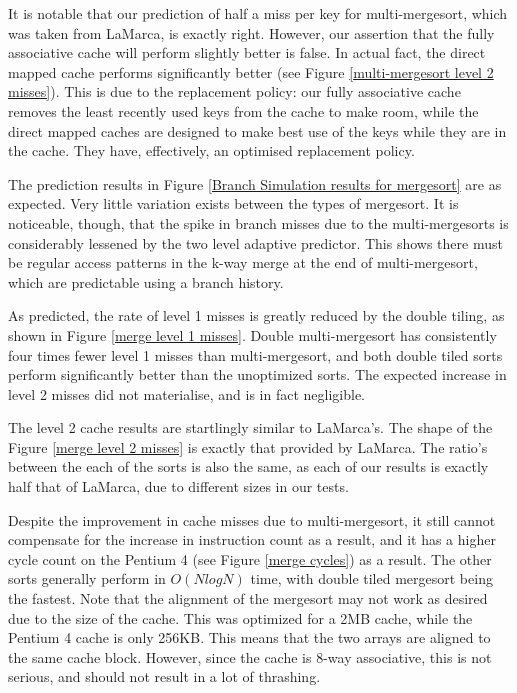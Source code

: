 It is notable that our prediction of half a miss per key for multi-mergesort,
which was taken from LaMarca, is exactly right. However, our assertion that the
fully associative cache will perform slightly better is false. In actual fact,
the direct mapped cache performs significantly better (see Figure
\vref{multi-mergesort level 2 misses}). This is due to the replacement policy:
our fully associative cache removes the least recently used keys from the cache
to make room, while the direct mapped caches are designed to make best use of
the keys while they are in the cache. They have, effectively, an optimised
replacement policy.

The prediction results in Figure \ref{Branch Simulation results for mergesort}
are as expected. Very little variation exists between the types of mergesort. It
is noticeable, though, that the spike in branch misses due to the
multi-mergesorts is considerably lessened by the two level adaptive predictor.
This shows there must be regular access patterns in the k-way merge at the end
of multi-mergesort, which are predictable using a branch history.

As predicted, the rate of level 1 misses is greatly reduced by the double
tiling, as shown in Figure \ref{merge level 1 misses}. Double multi-mergesort
has consistently four times fewer level 1 misses than multi-mergesort, and both
double tiled sorts perform significantly better than the unoptimized sorts. The
expected increase in level 2 misses did not materialise, and is in fact
negligible.

The level 2 cache results are startlingly similar to LaMarca's. The shape of the
Figure \ref{merge level 2 misses} is exactly that provided by LaMarca. The
ratio's between the each of the sorts is also the same, as each of our results
is exactly half that of LaMarca, due to different  sizes in our tests.

Despite the improvement in cache misses due to multi-mergesort, it still cannot
compensate for the increase in instruction count as a result, and it has a higher
cycle count on the Pentium 4 (see Figure \ref{merge cycles}) as a result. The
other sorts generally perform in $O(NlogN)$ time, with double tiled mergesort
being the fastest. Note that the alignment of the mergesort may not work as
desired due to the size of the cache. This was optimized for a 2MB cache, while
the Pentium 4 cache is only 256KB. This means that the two arrays are aligned to
the same cache block. However, since the cache is 8-way associative, this is not
serious, and should not result in a lot of thrashing.

